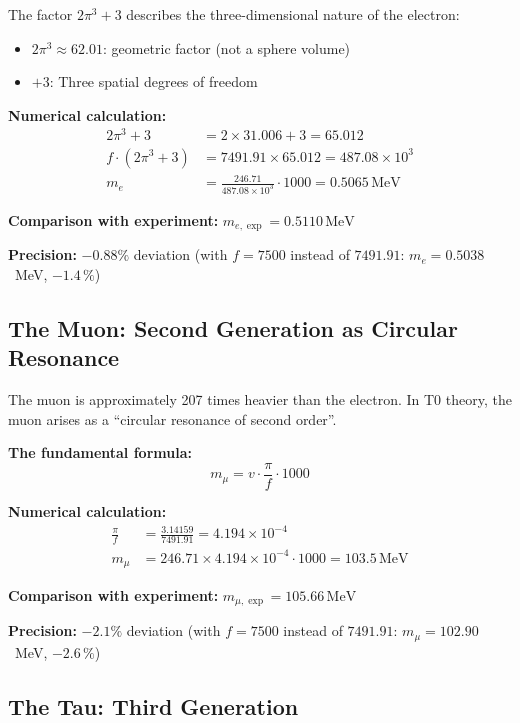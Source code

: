 	The factor \(2\pi^3 + 3\) describes the three-dimensional nature of the electron:
	\begin{itemize}
		\item \(2\pi^3 \approx 62.01\): geometric factor (not a sphere volume)
		\item \(+3\): Three spatial degrees of freedom
	\end{itemize}
	
	\textbf{Numerical calculation:}
	\begin{align}
		2\pi^3 + 3 &= 2 \times 31.006 + 3 = 65.012 \\
		f \cdot (2\pi^3 + 3) &= 7491.91 \times 65.012 = 487.08 \times 10^{3} \\
		m_e &= \frac{246.71}{487.08 \times 10^{3}} \cdot 1000 = 0.5065\,\text{MeV}
	\end{align}
	
	\textbf{Comparison with experiment:} \(m_{e,\exp} = 0.5110\,\text{MeV}\)
	
	\textbf{Precision:} \(-0.88\%\) deviation (with $f = 7500$ instead of $7491.91$: $m_e = 0.5038$~MeV, $-1.4\,\%$)
	
	\subsection{The Muon: Second Generation as Circular Resonance}
	
	The muon is approximately 207 times heavier than the electron. In T0 theory, the muon arises as a \enquote{circular resonance of second order}.
	
	\textbf{The fundamental formula:}
	\begin{equation}
		\boxed{m_\mu = v \cdot \frac{\pi}{f} \cdot 1000}
	\end{equation}
	
	\textbf{Numerical calculation:}
	\begin{align}
		\frac{\pi}{f} &= \frac{3.14159}{7491.91} = 4.194 \times 10^{-4} \\
		m_\mu &= 246.71 \times 4.194 \times 10^{-4} \cdot 1000 = 103.5\,\text{MeV}
	\end{align}
	
	\textbf{Comparison with experiment:} \(m_{\mu,\exp} = 105.66\,\text{MeV}\)
	
	\textbf{Precision:} \(-2.1\%\) deviation (with $f = 7500$ instead of $7491.91$: $m_\mu = 102.90$~MeV, $-2.6\,\%$)
	
	\subsection{The Tau: Third Generation}
	
